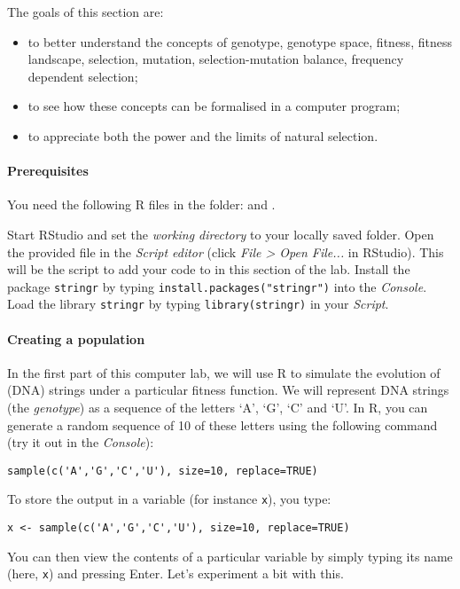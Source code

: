 \documentclass[a4paper, 9pt]{article}
\begin{document}
\begin{goals}
The goals of this section are:
\begin{itemize}
\item to better understand the concepts of genotype, genotype space, fitness, fitness landscape, selection, mutation, selection-mutation balance, frequency dependent selection;
\item to see how these concepts can be formalised in a computer program;
\item to appreciate both the power and the limits of natural selection.
\end{itemize}
\end{goals}

\paragraph{Prerequisites}
You need the following R files in the  folder:  and .\\

\begin{exercise}
    \action Start RStudio and set the \emph{working directory} to your locally saved  folder.
    \action Open the provided  file in the \emph{Script editor} (click \emph{File > Open File...} in RStudio). This will be the script to add your code to in this section of the lab. 
    \action Install the package \texttt{stringr} by typing \verb|install.packages("stringr")| into the \emph{Console}.
    \action Load the library \texttt{stringr} by typing \texttt{library(stringr)} in your \emph{Script}.
\end{exercise}

\paragraph{Creating a population} In the first part of this computer lab, we will use R to simulate the evolution of (DNA) strings under a particular fitness function. We will represent DNA strings (the \emph{genotype}) as a sequence of the letters `A', `G', `C' and `U'. In R, you can generate a random sequence of 10 of these letters using the following command (try it out in the \emph{Console}):

\begin{lstlisting}
sample(c('A','G','C','U'), size=10, replace=TRUE)
\end{lstlisting}
To store the output in a variable (for instance \texttt{x}), you
type:
\begin{lstlisting}
x <- sample(c('A','G','C','U'), size=10, replace=TRUE)
\end{lstlisting}
You can then view the contents of a particular variable by simply typing
its name (here, \texttt{x}) and pressing Enter. Let's experiment a bit with this.
\end{document}
